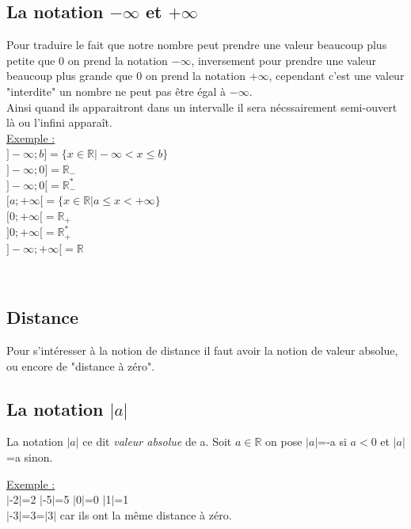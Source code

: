 \documentclass[french]{book}
\newcommand{\R}{\mathbb {R}}
\newcommand{\abs}[1]{$\vert #1 \vert$}
\begin{document}
\subsection*{La notation $- \infty$ et $+ \infty$}

Pour traduire le fait que notre nombre peut prendre une valeur beaucoup plus petite que $0$ on prend la notation $- \infty$, inversement pour prendre une valeur beaucoup plus grande que $0$ on prend la notation $+ \infty$, cependant c'est une valeur "interdite" un nombre ne peut pas être égal à $- \infty$.\\


Ainsi quand ils apparaitront dans un intervalle il sera nécssairement semi-ouvert là ou l'infini apparaît.\\

\underline{Exemple :}\\

$]- \infty;b]=\{ x\in \R \vert  - \infty < x \leq b \}$\\
$]- \infty;0]=\R_-$ \\
$]- \infty;0[=\R_{-}^{*}$ \\
$[a;+ \infty[=\{ x\in \R \vert  a \leq x < + \infty \}$\\
$[0;+ \infty[=\R_+$\\
$]0;+ \infty[=\R_{+}^{*}$\\
$]- \infty;+ \infty[=\R$ 


\

\subsection{Distance}
Pour s'intéresser à la notion de distance il faut avoir la notion de valeur absolue, ou encore de "distance à zéro".

\subsection*{La notation $\vert a \vert$}


La notation \abs{a} ce dit \emph{valeur absolue} de a. Soit $a \in \R$ on pose \abs{a}=-a si  $a<0$ et \abs{a}=a sinon.

\underline{Exemple :}\\


\abs{$-2$}=2
\abs{$-5$}=5
\abs{$0$}=0
\abs{$1$}=1\\

\abs{$-3$}=3=\abs{$3$} car ils ont la même distance à zéro.
\end{document}
